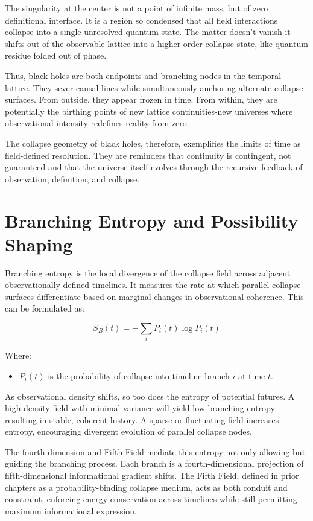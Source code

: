 The singularity at the center is not a point of infinite mass, but of zero definitional interface. It is a region so condensed that all field interactions collapse into a single unresolved quantum state. The matter doesn't vanish-it shifts out of the observable lattice into a higher-order collapse state, like quantum residue folded out of phase.

Thus, black holes are both endpoints and branching nodes in the temporal lattice. They sever causal lines while simultaneously anchoring alternate collapse surfaces. From outside, they appear frozen in time. From within, they are potentially the birthing points of new lattice continuities-new universes where observational intensity redefines reality from zero.

The collapse geometry\cite{chapter8_meta} of black holes, therefore, exemplifies the limits of time as field-defined resolution. They are reminders that continuity is contingent, not guaranteed-and that the universe itself evolves through the recursive feedback of observation, definition, and collapse.

\section{Branching Entropy and Possibility Shaping}

Branching entropy is the local divergence of the collapse field across adjacent observationally-defined timelines. It measures the rate at which parallel collapse surfaces differentiate based on marginal changes in observational coherence. This can be formulated as:

\begin{equation}
S_B(t) = -\sum_i P_i(t) \log P_i(t)
\end{equation}

Where:
\begin{itemize}
\item $P_i(t)$ is the probability of collapse into timeline branch $i$ at time $t$.
\end{itemize}

As observational density shifts, so too does the entropy of potential futures. A high-density field with minimal variance will yield low branching entropy-resulting in stable, coherent history. A sparse or fluctuating field increases entropy, encouraging divergent evolution of parallel collapse nodes.

The fourth dimension and Fifth Field mediate this entropy-not only allowing but guiding the branching process. Each branch is a fourth-dimensional projection of fifth-dimensional informational gradient shifts. The Fifth Field, defined in prior chapters as a probability-binding collapse medium, acts as both conduit and constraint, enforcing energy conservation across timelines while still permitting maximum informational expression.


